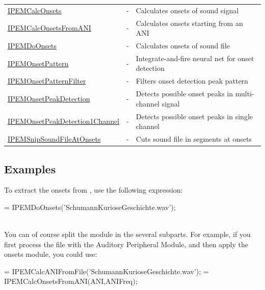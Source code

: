 \begin{tabularx}{\linewidth}{llX}
\hyperlink{FuncRef:IPEMCalcOnsets}{IPEMCalcOnsets} & - & Calculates onsets of sound signal\\
\hyperlink{FuncRef:IPEMCalcOnsetsFromANI}{IPEMCalcOnsetsFromANI} & - & Calculates onsets starting from an ANI\\
\hyperlink{FuncRef:IPEMDoOnsets}{IPEMDoOnsets} & - & Calculates onsets of sound file\\
\hyperlink{FuncRef:IPEMOnsetPattern}{IPEMOnsetPattern} & - & Integrate-and-fire neural net for onset detection\\
\hyperlink{FuncRef:IPEMOnsetPatternFilter}{IPEMOnsetPatternFilter} & - & Filters onset detection peak pattern\\
\hyperlink{FuncRef:IPEMOnsetPeakDetection}{IPEMOnsetPeakDetection} & - & Detects possible onset peaks in multi-channel signal\\
\hyperlink{FuncRef:IPEMOnsetPeakDetection1Channel}{IPEMOnsetPeakDetection1Channel} & - & Detects possible onset peaks in single channel\\
\hyperlink{FuncRef:IPEMSnipSoundFileAtOnsets}{IPEMSnipSoundFileAtOnsets} & - & Cuts sound file in segments at onsets\\
\end{tabularx}


\subsection{Examples}

To extract the onsets from
, use the following expression:\\

\begin{IPEMCodeEnvironment}
[Ts,Tsmp] = IPEMDoOnsets('SchumannKurioseGeschichte.wav');
\end{IPEMCodeEnvironment}\\

You can of course split the module in the several subparts. For
example, if you first process the file with the Auditory
Peripheral Module, and then apply the onsets module, you could
use:\\

\begin{IPEMCodeEnvironment}
 = IPEMCalcANIFromFile('SchumannKurioseGeschichte.wav');
 = IPEMCalcOnsetsFromANI(ANI,ANIFreq);
\end{IPEMCodeEnvironment}\\

